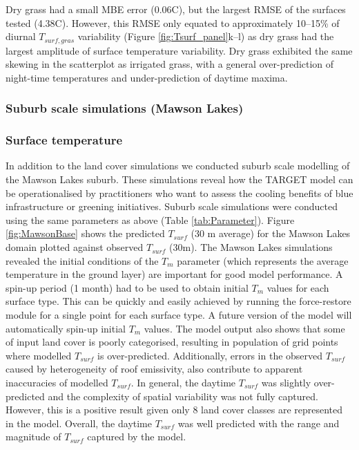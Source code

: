 \documentclass[gmd, manuscript]{copernicus}
\begin{document}
Dry grass had a small MBE error (0.06\degree C), but the largest RMSE of the surfaces tested (4.38\degree C). However, this RMSE only equated to approximately 10--15\% of diurnal $T_{surf,gras}$ variability (Figure \ref{fig:Tsurf_panel}k--l) as dry grass had the largest amplitude of surface temperature variability. Dry grass exhibited the same skewing in the scatterplot as irrigated grass, with a general over-prediction of night-time temperatures and under-prediction of daytime maxima. 





\subsubsection{Suburb scale simulations (Mawson Lakes)}\label{sec:suburbresult} 
\subsubsection*{Surface temperature}\label{sec:surftempresult} 



In addition to the land cover simulations we conducted suburb scale modelling of the Mawson Lakes suburb. These simulations reveal how the TARGET model can be operationalised by practitioners who want to assess the cooling benefits of blue infrastructure or greening initiatives. Suburb scale simulations were conducted using the same parameters as above (Table \ref{tab:Parameter}). Figure \ref{fig:MawsonBase} shows the predicted $T_{surf}$ (30 m average) for the Mawson Lakes domain plotted against observed $T_{surf}$ (30m). The Mawson Lakes simulations revealed the initial conditions of the \ensuremath{T_{m}} parameter (which represents the average temperature in the ground layer) are  important for good model performance. A spin-up period (1 month) had to be used to obtain initial \ensuremath{T_{m}} values for each surface type. This can be quickly and easily achieved by running the force-restore module for a single point for each surface type. A future version of the model will automatically spin-up initial \ensuremath{T_{m}} values. The model output also shows that some of input land cover is poorly categorised, resulting in population of grid points where modelled $T_{surf}$ is  over-predicted. Additionally, errors in the observed $T_{surf}$ caused by heterogeneity of roof emissivity,  also contribute to apparent inaccuracies of modelled $T_{surf}$. In general, the daytime $T_{surf}$ was slightly over-predicted and the complexity of spatial variability was not fully captured. However, this is a positive result given only 8 land cover classes are represented in the model. Overall, the daytime $T_{surf}$ was well predicted with the range and magnitude of $T_{surf}$ captured by the model. 
\end{document}
